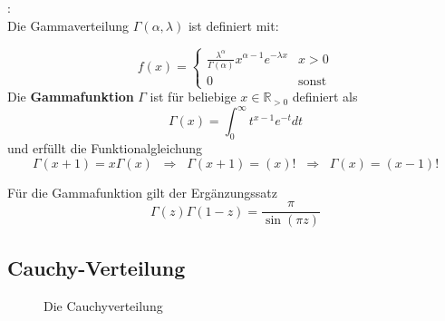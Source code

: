 {    \begin{definition}[Gammaverteilung]:\\

    Die Gammaverteilung  $\Gamma (\alpha ,\lambda )$ ist definiert mit:

    \[f\left(x\right)=\begin{cases}
    \frac{\lambda ^{\alpha }}{\Gamma\left(\alpha \right)}
    {x^{\alpha -1}e^{-\lambda x}}&x>0\\
    0 & \text{sonst}
    \end{cases}\]
    Die \textbf{Gammafunktion} $\Gamma $ ist für
    beliebige  $x\in \mathbb R_{>0}$ definiert als
    \[
    \Gamma \left(x\right)=\int _{0}^{{\infty}}{t^{x-1}e^{-t}}dt
    \]
    und erfüllt die Funktionalgleichung
    \[
        \Gamma \left(x+1\right)=x\Gamma (x)\;\;\Rightarrow\;\;\Gamma(x+1)=(x)!\;\;\Rightarrow\;\; \Gamma(x)=(x-1)!
    \]
    \end{definition}

    Für die Gammafunktion gilt der Ergänzungssatz
    \[
    \Gamma \left(z\right)\Gamma \left(1-z\right)=\frac{\pi }{\sin\left(\pi z\right)}
    \]

    \subsection{Cauchy-Verteilung}

    {
        \def\svala{1}
        \def\tvala{0}
        \def\svalb{0.5}
        \def\tvalb{0}
        \def\svalc{2}
        \def\tvalc{0}
        \def\svald{1}
        \def\tvald{2}

        \def\xmax{5}
        \begin{figure}
            \subfigure[Dichtefunktion]{
                \begin{tikzpicture}
                    
                \end{tikzpicture}
                \label{fig:cauchyverteilung_a}
            }
            \subfigure[Verteilungsfunktion]{
                \begin{tikzpicture}
                    
                \end{tikzpicture}
                \label{fig:cauchyverteilung_b}
            }
            \caption{Die Cauchyverteilung}
           \label{fig:cauchyverteilung}
        \end{figure}
    }

}
